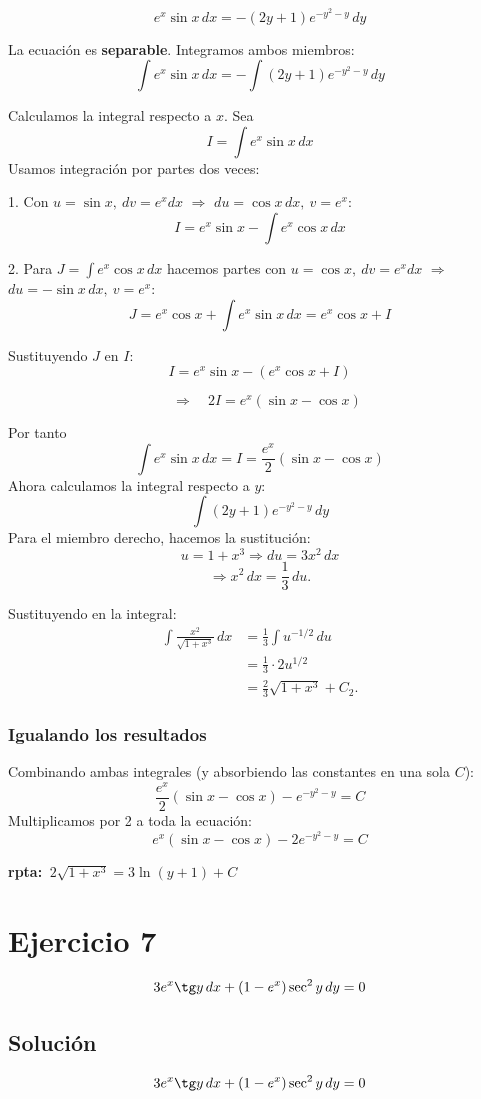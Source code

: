 \documentclass[12pt,a4paper]{article}
\begin{document}
\begin{multicols}{2}
\[
e^{x}\sin x\,dx=-(2y+1)e^{-y^2-y}\,dy
\]

La ecuación es \textbf{separable}. Integramos ambos miembros:
\[
\int e^{x}\sin x\,dx = -\int (2y+1)e^{-y^2-y}\,dy
\]

Calculamos la integral respecto a \(x\). Sea
\[
I=\int e^{x}\sin x\,dx
\]
Usamos integración por partes dos veces:

1. Con \(u=\sin x,\ dv=e^x dx\) \(\Rightarrow\) \(du=\cos x\,dx,\ v=e^x\):
\[
I=e^x\sin x-\int e^x\cos x\,dx
\]

2. Para \(J=\int e^x\cos x\,dx\) hacemos partes con \(u=\cos x,\ dv=e^x dx\) \(\Rightarrow\) \(du=-\sin x\,dx,\ v=e^x\):
\[
J=e^x\cos x+\int e^x\sin x\,dx = e^x\cos x + I
\]

Sustituyendo \(J\) en \(I\):
\[
I = e^x\sin x - (e^x\cos x + I) 
\]

\[\quad\Rightarrow\quad 2I = e^x(\sin x-\cos x)\]

Por tanto
\[
\; \int e^{x}\sin x\,dx = I = \frac{e^x}{2}(\sin x-\cos x)\; 
\]
\noindent
Ahora calculamos la integral respecto a \(y\):
\[
\int (2y+1)e^{-y^2-y}\,dy
\]
\noindent
Para el miembro derecho, hacemos la sustitución:
\[
u = 1 + x^{3} \Rightarrow du = 3x^{2}\,dx
\]
\[
\Rightarrow x^{2}\,dx = \frac{1}{3}\,du.
\]

Sustituyendo en la integral:
\begin{align*}
\int \frac{x^{2}}{\sqrt{1+x^{3}}}\,dx 
&= \frac{1}{3} \int u^{-1/2}\,du \\
&= \frac{1}{3} \cdot 2u^{1/2} \\
&= \frac{2}{3}\sqrt{1+x^{3}} + C_{2}.
\end{align*}
\subsubsection*{Igualando los resultados}
\noindent
Combinando ambas integrales (y absorbiendo las constantes en una sola $C$):
\[
\;\frac{e^x}{2}(\sin x-\cos x)-e^{-y^2-y}=C\;
\]
\noindent
Multiplicamos por 2 a toda la ecuación:
\[
\;{e^x}(\sin x-\cos x)-2e^{-y^2-y}=C\;
\]

\textbf{rpta: $\,2\sqrt{1+x^{3}} = 3\ln(y+1) + C\,$}


\section*{Ejercicio 7} \[3e^x\tg y \, dx+(1-e^x)\sec^2 y \, dy=0\] 
\subsection*{Solución} 
\[3e^x\tg y \, dx+(1-e^x)\sec^2 y \, dy=0\] 


\end{multicols}
\end{document}
